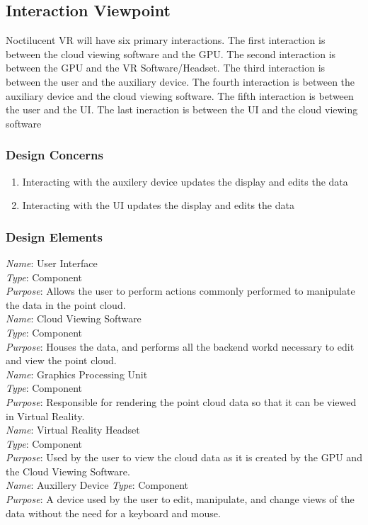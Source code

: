 \subsection{Interaction Viewpoint}

Noctilucent VR will have six primary interactions.
The first interaction is between the cloud viewing software and the GPU.
The second interaction is between the GPU and the VR Software/Headset.
The third interaction is between the user and the auxiliary device.
The fourth interaction is between the auxiliary device and the cloud viewing software.
The fifth interaction is between the user and the UI.
The last ineraction is between the UI and the cloud viewing software

\subsubsection{Design Concerns}

\begin{enumerate}
	\item Interacting with the auxilery device updates the display and edits the data
	\item Interacting with the UI updates the display and edits the data
\end{enumerate}

\subsubsection{Design Elements}

		\textit{Name}: User Interface\\
		\textit{Type}: Component\\
		\textit{Purpose}: Allows the user to perform actions commonly performed to manipulate the data in the point cloud.\\
\newline
		\textit{Name}: Cloud Viewing Software\\
		\textit{Type}: Component\\
		\textit{Purpose}: Houses the data, and performs all the backend workd necessary to edit and view the point cloud.\\
\newline
		\textit{Name}: Graphics Processing Unit\\
		\textit{Type}: Component\\
		\textit{Purpose}: Responsible for rendering the point cloud data so that it can be viewed in Virtual Reality.\\
\newline
		\textit{Name}: Virtual Reality Headset\\
		\textit{Type}: Component\\
		\textit{Purpose}: Used by the user to view the cloud data as it is created by the GPU and the Cloud Viewing Software.\\
\newline
		\textit{Name}: Auxillery Device
		\textit{Type}: Component\\
		\textit{Purpose}: A device used by the user to edit, manipulate, and change views of the data without the need for a keyboard and mouse.

